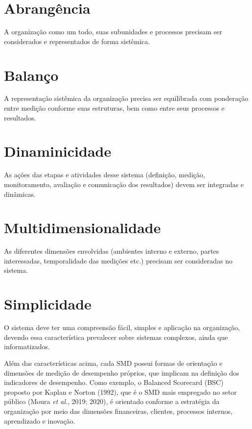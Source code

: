 \documentclass[
  letterpaper,
  DIV=11,
  numbers=noendperiod]{scrreprt}
\begin{document}
\section{Abrangência}

A organização como um todo, suas subunidades e processos precisam ser
considerados e representados de forma sistêmica.

\section{Balanço}

A representação sistêmica da organização precisa ser equilibrada com
ponderação entre medição conforme suas estruturas, bem como entre seus
processos e resultados.

\section{Dinaminicidade}

As ações das etapas e atividades desse sistema (definição, medição,
monitoramento, avaliação e comunicação dos resultados) devem ser
integradas e dinâmicas.

\section{Multidimensionalidade}

As diferentes dimensões envolvidas (ambientes interno e externo, partes
interessadas, temporalidade das medições etc.) precisam ser consideradas
no sistema.

\section{Simplicidade}

O sistema deve ter uma compreensão fácil, simples e aplicação na
organização, devendo essa característica prevalecer sobre sistemas
complexos, ainda que informatizados.

Além das características acima, cada SMD possui formas de orientação e
dimensões de medição de desempenho próprios, que implicam na definição
dos indicadores de desempenho. Como exemplo, o Balanced Scorecard (BSC)
proposto por Kaplan e Norton (1992), que é o SMD mais empregado no setor
público (Moura \emph{et al}., 2019; 2020), é orientado conforme a
estratégia da organização por meio das dimensões financeiras, clientes,
processos internos, aprendizado e inovação.
\end{document}
